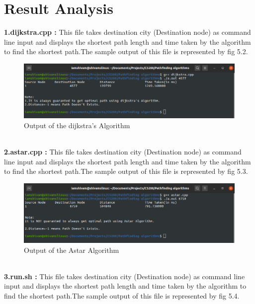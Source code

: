 \documentclass[14pt,a4]{extreport}
\begin{document}
\section{Result Analysis}
\textbf{1.dijkstra.cpp :}\newline
This file takes destination city (Destination node) as command line input and displays the shortest path length and time taken by the algorithm to find the shortest path.The sample output of this file is represented by fig 5.2.
\begin{figure}
\includegraphics[width=24cm]{images/dijkstra.png}
\caption{Output of the dijkstra's Algorithm}
\label{fig:1}
\end{figure}
\newline
\\
\textbf{2.astar.cpp :}\newline
This file takes destination city (Destination node) as command line input and displays the shortest path length and time taken by the algorithm to find the shortest path.The sample output of this file is represented by fig 5.3.
\newline
\begin{figure}
\includegraphics[width=24cm]{images/astar.png}
\caption{Output of the  Astar Algorithm}
\label{fig:1}
\end{figure}
\\
\textbf{3.run.sh :}\newline
This file takes destination city (Destination node) as command line input and displays the shortest path length and time taken by the algorithm to find the shortest path.The sample output of this file is represented by fig 5.4.
\newline
\end{document}
